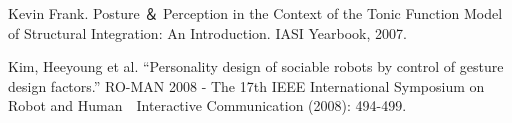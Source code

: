 \begin{thebibliography}{27}
Kevin Frank. Posture ＆ Perception in the Context of the Tonic Function Model of Structural Integration: An Introduction. IASI Yearbook, 2007.

Kim, Heeyoung et al. “Personality design of sociable robots by control of gesture design factors.” RO-MAN 2008 - The 17th IEEE International Symposium on Robot and Human　Interactive Communication (2008): 494-499.



















\end{thebibliography}